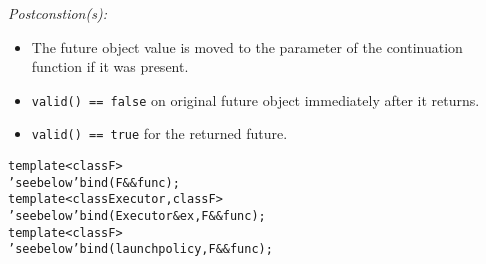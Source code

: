 \documentclass[a4paper,10pt]{article}
\newcommand{\cpp}[1]{\lstinline{#1}}
\newcommand{\wordingItem}[1]{\noindent\textit{#1:}}
\newenvironment{wordingPara}{\begin{adjustwidth}{12pt}{}}{\end{adjustwidth}}
\newenvironment{Postconditions}{\wordingItem{Postconstion(s)}\vspace{7pt}\noindent\begin{adjustwidth}{12pt}{}}{\vspace{7pt}\end{adjustwidth}}
\newcommand{\update}[1]{\colorbox{update_color}{#1}}
\begin{document}
\begin{wordingPara}
\begin{Postconditions}
\begin{itemize}
\item The future object value is moved to the parameter of the continuation function if it was present.
\item \cpp{valid() == false} on original future object immediately after it returns.
\item \cpp{valid() == true} for the returned future.
\end{itemize}
\end{Postconditions}

\end{wordingPara}
\begin{alltt}
\update{template<class F> }
\update{'see below' bind(F&& func); }
\update{template<class Executor, class F> }
\update{'see below' bind(Executor &ex, F&& func); }
\update{template<class F> }
\update{'see below' bind(launch policy, F&& func);}
\end{alltt}
\end{document}
